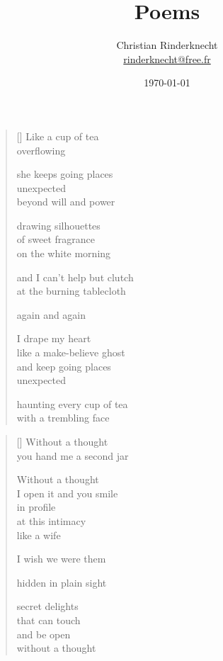\documentclass[12pt,a4paper]{article}
\title{Poems}
\author{Christian Rinderknecht\\
{\small \url{rinderknecht@free.fr}}}
\date{\today}
\begin{document}
\maketitle

\thispagestyle{empty}

\newpage\leavevmode\thispagestyle{empty}\newpage


\newpage

\poemtitle{}

\settowidth{\versewidth}{Like a make-believe ghost}

\bigskip

\begin{verse}[\versewidth]
  Like a cup of tea \\
  overflowing

  she keeps going places \\
  unexpected \\
  beyond will and power

  drawing silhouettes \\
  of sweet fragrance \\
  on the white morning

  and I can't help but clutch \\
  at the burning tablecloth

  again and again

  I drape my heart \\
  like a make-believe ghost \\
  and keep going places \\
  unexpected

  haunting every cup of tea \\
  with a trembling face
\end{verse}


\newpage

\poemtitle{}

\settowidth{\versewidth}{You hand me a second jar}

\bigskip

\begin{verse}[\versewidth]
  Without a thought \\
  you hand me a second jar

  Without a thought \\
  I open it and you smile \\
  in profile \\
  at this intimacy \\
  like a wife

  I wish we were them

  hidden in plain sight

  secret delights \\
  that can touch \\
  and be open \\
  without a thought
\end{verse}
\end{document}
